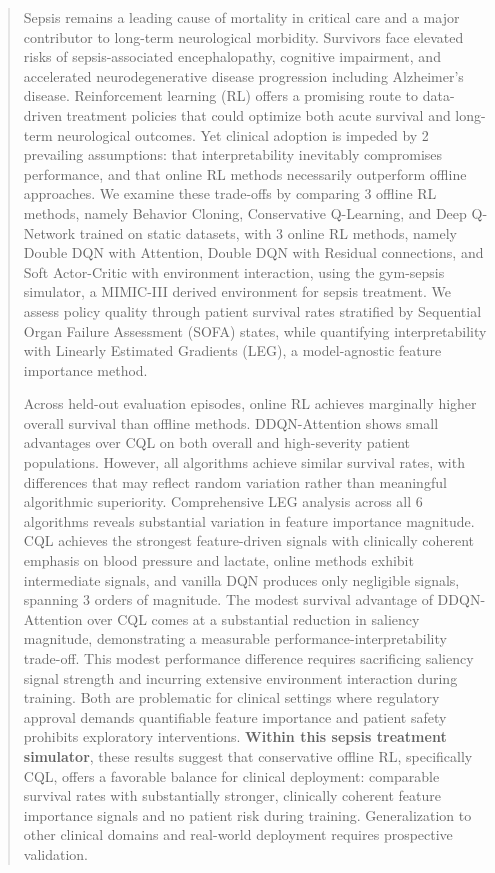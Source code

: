 \documentclass[11pt]{article}
\begin{document}
\bigskip
\begin{abstract}
Sepsis remains a leading cause of mortality in critical care and a major contributor to long-term neurological morbidity. Survivors face elevated risks of sepsis-associated encephalopathy, cognitive impairment, and accelerated neurodegenerative disease progression including Alzheimer's disease. Reinforcement learning (RL) offers a promising route to data-driven treatment policies that could optimize both acute survival and long-term neurological outcomes. Yet clinical adoption is impeded by 2 prevailing assumptions: that interpretability inevitably compromises performance, and that online RL methods necessarily outperform offline approaches. We examine these trade-offs by comparing 3 offline RL methods, namely Behavior Cloning, Conservative Q-Learning, and Deep Q-Network trained on static datasets, with 3 online RL methods, namely Double DQN with Attention, Double DQN with Residual connections, and Soft Actor-Critic with environment interaction, using the gym-sepsis simulator, a MIMIC-III derived environment for sepsis treatment. We assess policy quality through patient survival rates stratified by Sequential Organ Failure Assessment (SOFA) states, while quantifying interpretability with Linearly Estimated Gradients (LEG), a model-agnostic feature importance method.

Across held-out evaluation episodes, online RL achieves marginally higher overall survival than offline methods. DDQN-Attention shows small advantages over CQL on both overall and high-severity patient populations. However, all algorithms achieve similar survival rates, with differences that may reflect random variation rather than meaningful algorithmic superiority. Comprehensive LEG analysis across all 6 algorithms reveals substantial variation in feature importance magnitude. CQL achieves the strongest feature-driven signals with clinically coherent emphasis on blood pressure and lactate, online methods exhibit intermediate signals, and vanilla DQN produces only negligible signals, spanning 3 orders of magnitude. The modest survival advantage of DDQN-Attention over CQL comes at a substantial reduction in saliency magnitude, demonstrating a measurable performance-interpretability trade-off. This modest performance difference requires sacrificing saliency signal strength and incurring extensive environment interaction during training. Both are problematic for clinical settings where regulatory approval demands quantifiable feature importance and patient safety prohibits exploratory interventions. \textbf{Within this sepsis treatment simulator}, these results suggest that conservative offline RL, specifically CQL, offers a favorable balance for clinical deployment: comparable survival rates with substantially stronger, clinically coherent feature importance signals and no patient risk during training. Generalization to other clinical domains and real-world deployment requires prospective validation.
\end{abstract}
\end{document}
